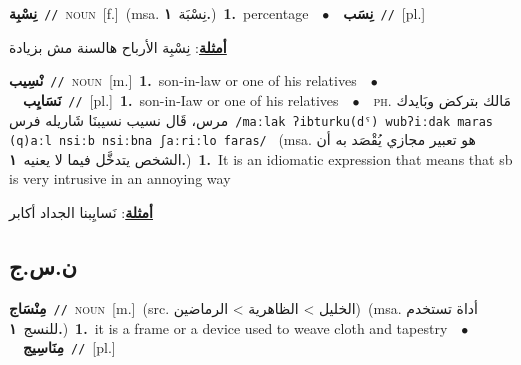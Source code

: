 \documentclass[10pt,a4paper,twoside]{article} %
\begin{document}
\begin{multicols}{2}
{\setlength\topsep{0pt}\textbf{\foreignlanguage{arabic}{نِسْبِة}}\ {\color{gray}\texttt{//}\color{black}}\ \textsc{noun}\ [f.]\ \color{gray}(msa. \foreignlanguage{arabic}{نِسْبَة}~\foreignlanguage{arabic}{\textbf{١.}})\color{black}\ \textbf{1.}~percentage\ \ $\bullet$\ \ \setlength\topsep{0pt}\textbf{\foreignlanguage{arabic}{نِسَب}}\ {\color{gray}\texttt{//}\color{black}}\ [pl.]\  \begin{flushright}\color{gray}\foreignlanguage{arabic}{\textbf{\underline{\foreignlanguage{arabic}{أمثلة}}}: نِسْبِة الأرباح هالسنة مش بزيادة}\end{flushright}\color{black}} \vspace{2mm}

{\setlength\topsep{0pt}\textbf{\foreignlanguage{arabic}{نْسِيب}}\ {\color{gray}\texttt{//}\color{black}}\ \textsc{noun}\ [m.]\ \textbf{1.}~son-in-law or one of his relatives\ \ $\bullet$\ \ \setlength\topsep{0pt}\textbf{\foreignlanguage{arabic}{نَسَايِب}}\ {\color{gray}\texttt{//}\color{black}}\ [pl.]\ \textbf{1.}~son-in-Iaw or one of his relatives\ \ $\bullet$\ \ \textsc{ph.} \color{gray} \foreignlanguage{arabic}{مَالك بتركض وبَايدك مرس، قَال نسيب نسيبنَا شَاريله فرس}\color{black}\ {\color{gray}\texttt{/{\sffamily maːlak ʔibturku(dˤ) wubʔiːdak maras (q)aːl nsiːb nsiːbna ʃaːriːlo faras}/}\color{black}}\ \color{gray} (msa. \foreignlanguage{arabic}{هو تعبير مجازي يُقْصَد به أن الشخص يتدخَّل فيما لا يعنيه}~\foreignlanguage{arabic}{\textbf{١.}})\color{black}\ \textbf{1.}~It is an idiomatic expression that means that sb is very intrusive in an annoying way\  \begin{flushright}\color{gray}\foreignlanguage{arabic}{\textbf{\underline{\foreignlanguage{arabic}{أمثلة}}}: نَسايِبنا الجداد أكابر}\end{flushright}\color{black}} \vspace{2mm}

\vspace{-3mm}
\subsection*{\color{blue}\foreignlanguage{arabic}{ن.س.ج}\color{blue}{}} 

{\setlength\topsep{0pt}\textbf{\foreignlanguage{arabic}{مِنْسَاج}}\ {\color{gray}\texttt{//}\color{black}}\ \textsc{noun}\ [m.]\ (src. \color{gray}\foreignlanguage{arabic}{الخليل > الظاهرية > الرماضين}\color{black})\ \color{gray}(msa. \foreignlanguage{arabic}{أداة تستخدم للنسج}~\foreignlanguage{arabic}{\textbf{١.}})\color{black}\ \textbf{1.}~it is a frame  or a device used to weave cloth and tapestry\ \ $\bullet$\ \ \setlength\topsep{0pt}\textbf{\foreignlanguage{arabic}{مِنَاسِيج}}\ {\color{gray}\texttt{//}\color{black}}\ [pl.]\ } \vspace{2mm}


\end{multicols}
\end{document}
